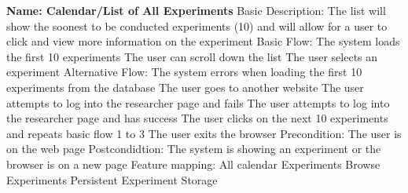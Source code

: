 \begin{outline}[enumerate]
\1 {\bf Name: Calendar/List of All Experiments}
\2 Basic Description: The list will show the soonest to be conducted experiments (10) and will allow for a user to click and view more information on the experiment
\2 Basic Flow:
\3 The system loads the first 10 experiments
\3 The user can scroll down the list
\3 The user selects an experiment
\2 Alternative Flow:
\3The system errors when loading the first 10 experiments from the database
\3 The user goes to another website
\3 The user attempts to log into the researcher page and fails
\3 The user attempts to log into the researcher page and has success
\3 The user clicks on the next 10 experiments and repeats basic flow 1 to 3
\3 The user exits the browser
\2 Precondition:
\3 The user is on the web page
\2 Postcondidtion:
\3 The system is showing an experiment or the browser is on a new page
\2 Feature mapping:
\3 All calendar Experiments
\3 Browse Experiments
\3 Persistent Experiment Storage



\end{outline}